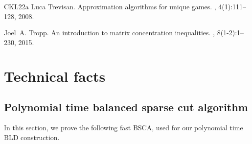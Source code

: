 \documentclass[epsfig,letter,11pt]{article}
\numberwithin{equation}{section}
\begin{document}
\begin{thebibliography}{CKL{\etalchar{+}}22a}
Luca Trevisan.
\newblock Approximation algorithms for unique games.
, 4(1):111--128, 2008.

Joel~A. Tropp.
\newblock An introduction to matrix concentration inequalities.
, 8(1-2):1--230, 2015.

\end{thebibliography}

\newpage

\appendix

\section{Technical facts}
\subsection{Polynomial time balanced sparse cut algorithm}
\label{apndx:selfloops}
In this section, we prove the following fast BSCA, used for our polynomial time BLD construction.

\fastbalsparse*
\end{document}
